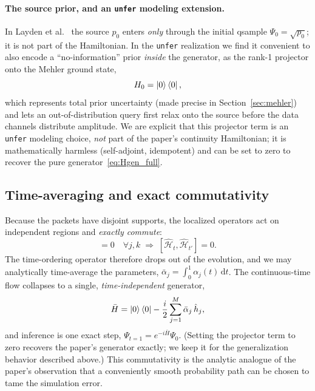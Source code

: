 \documentclass[11pt, a4paper]{article}
\newcommand{\Hgen}{\hat{\mathcal{H}}}
\begin{document}
\paragraph{The source prior, and an \texttt{unfer} modeling extension.}
In Layden et al.~\cite{Layden2025} the source $p_0$ enters \emph{only} through
the initial qsample $\Psi_0=\sqrt{p_0}$; it is not part of the Hamiltonian. In
the \texttt{unfer} realization we find it convenient to also encode a
``no-information'' prior \emph{inside} the generator, as the rank-1 projector
onto the Mehler ground state,
\begin{equation}
  H_0=\ket{0}\bra{0},
\end{equation}
which represents total prior uncertainty (made precise in
Section~\ref{sec:mehler}) and lets an out-of-distribution query first relax onto
the source before the data channels distribute amplitude. We are explicit that
this projector term is an \texttt{unfer} modeling choice, \emph{not} part of the
paper's continuity Hamiltonian; it is mathematically harmless (self-adjoint,
idempotent) and can be set to zero to recover the pure
generator~\eqref{eq:Hgen_full}.

\subsection{Time-averaging and exact commutativity}

Because the packets have disjoint supports, the localized operators act on
independent regions and \emph{exactly commute}:
\begin{equation}
  [\hat h_j,\hat h_k]=0\quad\forall j,k
  \;\Longrightarrow\;[\Hgen_t,\Hgen_{t'}]=0 .
\end{equation}
The time-ordering operator therefore drops out of the evolution, and we may
analytically time-average the parameters, $\bar\alpha_j=\int_0^1\alpha_j(t)\,
\mathrm{d}t$. The continuous-time flow collapses to a single,
\emph{time-independent} generator,
\begin{equation}
  \bar H=\ket{0}\bra{0}-\frac{i}{2}\sum_{j=1}^M\bar\alpha_j\,\hat h_j ,
  \label{eq:Hbar}
\end{equation}
and inference is one exact step, $\Psi_{t=1}=e^{-i\bar H}\Psi_0$. (Setting the
projector term to zero recovers the paper's generator exactly; we keep it for
the generalization behavior described above.) This commutativity is the
analytic analogue of the paper's observation that a conveniently smooth
probability path can be chosen to tame the simulation error.
\end{document}
